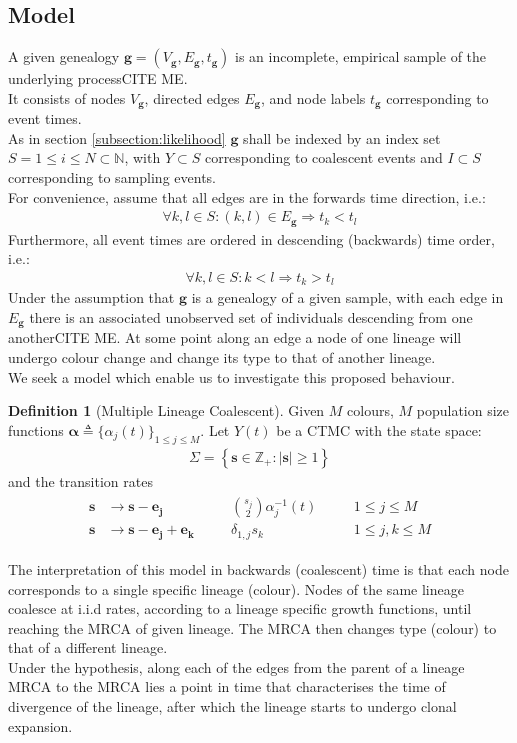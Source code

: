\documentclass{report}
\newcommand{\N}{\mathbb{N}}
\newcommand{\Z}{\mathbb{Z}}
\newcommand{\CITEMISSING}{\colorbox{BurntOrange}{CITE ME}}
\theoremstyle{definition}
\newtheorem{definition}{Definition}[section]
\begin{document}
\subsection{Model}
A given genealogy $\mathbf{g}=(V_\mathbf{g}, E_\mathbf{g}, t_\mathbf{g})$ is an incomplete, empirical sample of the underlying process\CITEMISSING.\\
It consists of nodes $V_\mathbf{g}$, directed edges $E_\mathbf{g}$, and node labels $t_\mathbf{g}$ corresponding to event times.\\
As in section \ref{subsection:likelihood} $\mathbf{g}$ shall be indexed by an index set $S=1\leq i \leq N\subset \N$, with $Y\subset S$ corresponding to coalescent events and $I\subset S$ corresponding to sampling events.\\
For convenience, assume that all edges are in the forwards time direction, i.e.: 
\begin{gather*}
\forall k,l \in S: (k,l)\in E_\mathbf{g} \Rightarrow t_k<t_l
\end{gather*}
Furthermore, all event times are ordered in descending (backwards) time order, i.e.:
\begin{gather*}
\forall k,l \in S: k<l \Rightarrow t_k > t_l
\end{gather*}
Under the assumption that $\mathbf{g}$ is a genealogy of a given sample, with each edge in $E_\mathbf{g}$ there is an associated unobserved set of individuals descending from one another\CITEMISSING. At some point along an edge a node of one lineage will undergo colour change and change its type to that of another lineage.\\
We seek a model which enable us to investigate this proposed behaviour.
\begin{definition}[Multiple Lineage Coalescent]\label{def:model}
Given $M$ colours, $M$ population size functions $\mathbf{\alpha}\triangleq\{\alpha_j(t)\}_{1\leq j\leq M}$. Let $Y(t)$ be a CTMC with the state space:
\begin{gather}
  \Sigma = \left\{\mathbf{s}\in \Z_+: |\mathbf{s}|\geq1\right\}
\end{gather}
and the transition rates
\begin{gather}\label{eq:multirate}
\begin{align}
\mathbf{s}&\to\mathbf{s}-\mathbf{e_j} &\quad& \binom{s_j}{2}\alpha_j^{-1}(t)&\quad&1\leq j\leq M\\
\mathbf{s}&\to\mathbf{s}-\mathbf{e_j}+\mathbf{e_k}&\quad& \delta_{1,j}s_k&\quad&1\leq j,k\leq M
\end{align}
\end{gather}
\end{definition}
The interpretation of this model in backwards (coalescent) time is that each node corresponds to a single specific lineage (colour). Nodes of the same lineage coalesce at i.i.d rates, according to a lineage specific growth functions, until reaching the MRCA of given lineage. The MRCA then changes type (colour) to that of a different lineage. \\
Under the hypothesis, along each of the edges from the parent of a lineage MRCA to the MRCA lies a point in time that characterises the time of divergence of the lineage, after which the lineage starts to undergo clonal expansion.
\end{document}
